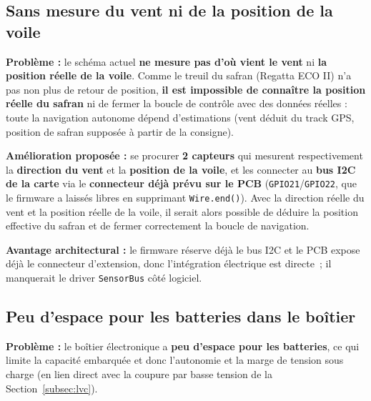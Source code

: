\documentclass[12pt,a4paper]{article}
\newcommand{\gpio}[1]{\texttt{GPIO#1}}
\newcommand{\file}[1]{\texttt{#1}}
\begin{document}
\subsection{Sans mesure du vent ni de la position de la voile}

\begin{warningbox}
  \textbf{Probl\`eme :} le sch\'ema actuel \textbf{ne mesure pas d'o\`u vient le vent}
  ni \textbf{la position r\'eelle de la voile}. Comme le treuil du safran (Regatta ECO
  II) n'a pas non plus de retour de position, \textbf{il est impossible de conna\^itre
  la position r\'eelle du safran} ni de fermer la boucle de contr\^ole avec des
  donn\'ees r\'eelles : toute la navigation autonome d\'epend d'estimations (vent
  d\'eduit du track GPS, position de safran suppos\'ee à partir de la consigne).
\end{warningbox}

\begin{okbox}
  \textbf{Am\'elioration propos\'ee :} se procurer \textbf{2 capteurs} qui mesurent
  respectivement la \textbf{direction du vent} et la \textbf{position de la voile}, et
  les connecter au \textbf{bus I2C de la carte} via le \textbf{connecteur d\'ej\`a
  pr\'evu sur le PCB} (\gpio{21}/\gpio{22}, que le firmware a laiss\'es libres en
  supprimant \texttt{Wire.end()}). Avec la direction r\'eelle du vent et la position
  r\'eelle de la voile, il serait alors possible de d\'eduire la position effective du
  safran et de fermer correctement la boucle de navigation.

  \textbf{Avantage architectural :} le firmware r\'eserve d\'ej\`a le bus I2C et le PCB
  expose d\'ej\`a le connecteur d'extension, donc l'int\'egration \'electrique est
  directe~; il manquerait le driver \file{SensorBus} c\^ot\'e logiciel.
\end{okbox}

\subsection{Peu d'espace pour les batteries dans le bo\^itier}

\begin{warningbox}
  \textbf{Probl\`eme :} le bo\^itier \'electronique a \textbf{peu d'espace pour les
  batteries}, ce qui limite la capacit\'e embarqu\'ee et donc l'autonomie et la marge
  de tension sous charge (en lien direct avec la coupure par basse tension de la
  Section~\ref{subsec:lvc}).
\end{warningbox}
\end{document}
